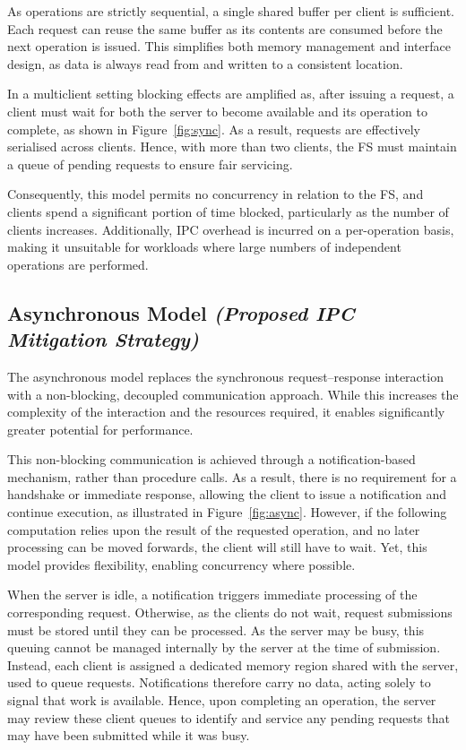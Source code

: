 As operations are strictly sequential, a single shared buffer per client is sufficient. Each request can reuse the same buffer as its contents are consumed before the next operation is issued. This simplifies both memory management and interface design, as data is always read from and written to a consistent location.

In a multiclient setting blocking effects are amplified as, after issuing a request, a client must wait for both the server to become available and its operation to complete, as shown in Figure~\ref{fig:sync}. As a result, requests are effectively serialised across clients. Hence, with more than two clients, the FS must maintain a queue of pending requests to ensure fair servicing.

Consequently, this model permits no concurrency in relation to the FS, and clients spend a significant portion of time blocked, particularly as the number of clients increases. Additionally, IPC overhead is incurred on a per-operation basis, making it unsuitable for workloads where large numbers of independent operations are performed.

\subsection{Asynchronous Model \textit{(Proposed IPC Mitigation Strategy)}}\label{sec:ipc_design}

The asynchronous model replaces the synchronous request–response interaction with a non-blocking, decoupled communication approach. While this increases the complexity of the interaction and the resources required, it enables significantly greater potential for performance.

This non-blocking communication is achieved through a notification-based mechanism, rather than procedure calls. As a result, there is no requirement for a handshake or immediate response, allowing the client to issue a notification and continue execution, as illustrated in Figure~\ref{fig:async}. However, if the following computation relies upon the result of the requested operation, and no later processing can be moved forwards, the client will still have to wait. Yet, this model provides flexibility, enabling concurrency where possible.

When the server is idle, a notification triggers immediate processing of the corresponding request. Otherwise, as the clients do not wait, request submissions must be stored until they can be processed. As the server may be busy, this queuing cannot be managed internally by the server at the time of submission. Instead, each client is assigned a dedicated memory region shared with the server, used to queue requests. Notifications therefore carry no data, acting solely to signal that work is available. Hence, upon completing an operation, the server may review these client queues to identify and service any pending requests that may have been submitted while it was busy.


